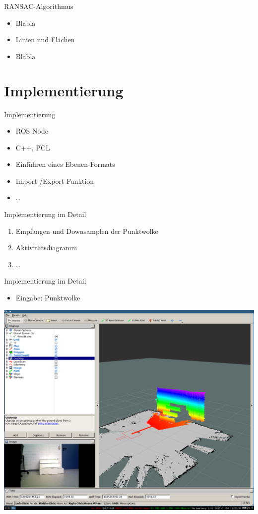 \documentclass[18pt]{beamer}
\begin{document}
\begin{frame}{RANSAC-Algorithmus}
	\begin{itemize}
		\item Blabla
		\item Linien und Flächen
		\item Blabla
	\end{itemize}
\end{frame}



\section{Implementierung}

\begin{frame}{Implementierung}
	\begin{itemize}
		\item ROS Node
		\item C++, PCL
		\item Einführen eines Ebenen-Formats
		\item Import-/Export-Funktion
		\item \dots
	\end{itemize}
\end{frame}

\begin{frame}{Implementierung im Detail}
	\begin{enumerate}
		\item Empfangen und Downsamplen der Punktwolke
		\item Aktivitätsdiagramm
		\item \dots
	\end{enumerate}
\end{frame}

\begin{frame}{Implementierung im Detail}
	\begin{itemize}
		\item Eingabe: Punktwolke
	\end{itemize}
	\begin{center}
		\includegraphics[scale=0.16]{images/ransac00.pdf}
	\end{center}
\end{frame}
\end{document}
